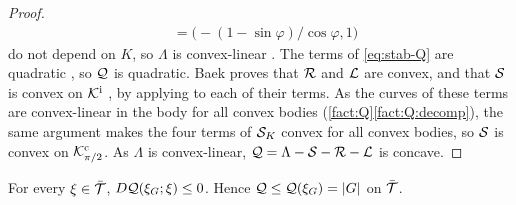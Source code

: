 \begin{proof}
\begin{align*}
    &=\bigl(-(1-\sin\varphi)/\cos\varphi,1\bigr)
\end{align*}
do not depend on $K$, so $\Lambda$ is convex-linear . The
terms of \eqref{eq:stab-Q} are quadratic , so $\mathcal{Q}$ is quadratic.
Baek proves that $\mathcal{R}$ and $\mathcal{L}$ are convex, and that $\mathcal{S}$ is convex on $\mathcal{K}^{\mathrm{i}}$
, by applying  to each of their terms. As
the curves of these terms are convex-linear in the body for all convex bodies
(\cref{fact:Q}\ref{fact:Q:decomp}), the same argument makes the four terms of
$\mathcal{S}_K$ convex for all convex bodies, so $\mathcal{S}$ is convex on $\mathcal{K}^{\mathrm{c}}_{\pi/2}$. As
$\Lambda$ is convex-linear, $\mathcal{Q}=\Lambda-\mathcal{S}-\mathcal{R}-\mathcal{L}$ is concave.
\end{proof}

\begin{lemma}\label{lem:stab-variation}
For every $\xi\in\bar{\mathcal{T}}$, $D\mathcal{Q}(\xi_G;\xi)\le0$. Hence
$\mathcal{Q}\le\mathcal{Q}(\xi_G)=\lvert G\rvert$ on $\bar{\mathcal{T}}$.
\end{lemma}

